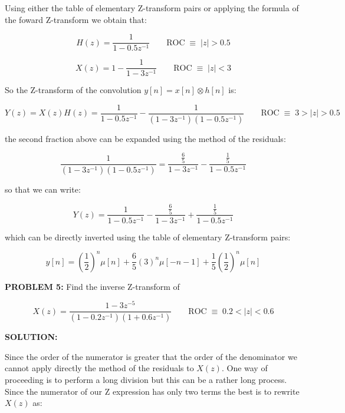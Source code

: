 \documentclass[a4paper,11pt,oneside]{article}
\begin{document}

Using either the table of elementary Z-transform pairs or applying the formula of the foward Z-transform we obtain that:

\[
H(z) = \frac{1}{1-0.5z^{-1}} \qquad \textrm{ROC} \;\equiv\; |z|>0.5
\]

\[
X(z) = 1 - \frac{1}{1-3z^{-1}} \qquad \textrm{ROC} \;\equiv\; |z|<3
\]

So the Z-transform of the convolution $y[n]=x[n]\otimes h[n]$ is:

\[
Y(z)=X(z)H(z)=\frac{1}{1-0.5z^{-1}}-\frac{1}{(1-3z^{-1})(1-0.5z^{-1})} \qquad \textrm{ROC} \;\equiv\; 3>|z|>0.5
\]

the second fraction above can be expanded using the method of the residuals:

\[
\frac{1}{(1-3z^{-1})(1-0.5z^{-1})}=\frac{\frac{6}{5}}{1-3z^{-1}}-\frac{\frac{1}{5}}{1-0.5z^{-1}}
\]

so that we can write:

\[
Y(z)=\frac{1}{1-0.5z^{-1}}-\frac{\frac{6}{5}}{1-3z^{-1}}+\frac{\frac{1}{5}}{1-0.5z^{-1}}
\]

which can be directly inverted using the table of elementary Z-transform pairs:

\[
y[n] = \left(\frac{1}{2}\right)^{n}\mu[n]+\frac{6}{5}\left(3\right)^{n}\mu[-n-1]+\frac{1}{5}\left(\frac{1}{2}\right)^n\mu[n]
\]






\vspace{1cm}

\textbf{PROBLEM 5:} Find the inverse Z-transform of

\[
X(z) = \frac{1-3z^{-5}}{(1-0.2z^{-1})(1+0.6z^{-1})} \qquad \textrm{ROC}\;\equiv\; 0.2<|z|<0.6
\]

\vspace{1cm}

\textbf{SOLUTION:}

Since the order of the numerator is greater that the order of the denominator we cannot apply directly the method of the residuals to $X(z)$. One way of proceeding is to perform a long division but this can be a rather long process. Since the numerator of our Z expression has only two terms the best is to rewrite $X(z)$ as:
\end{document}

